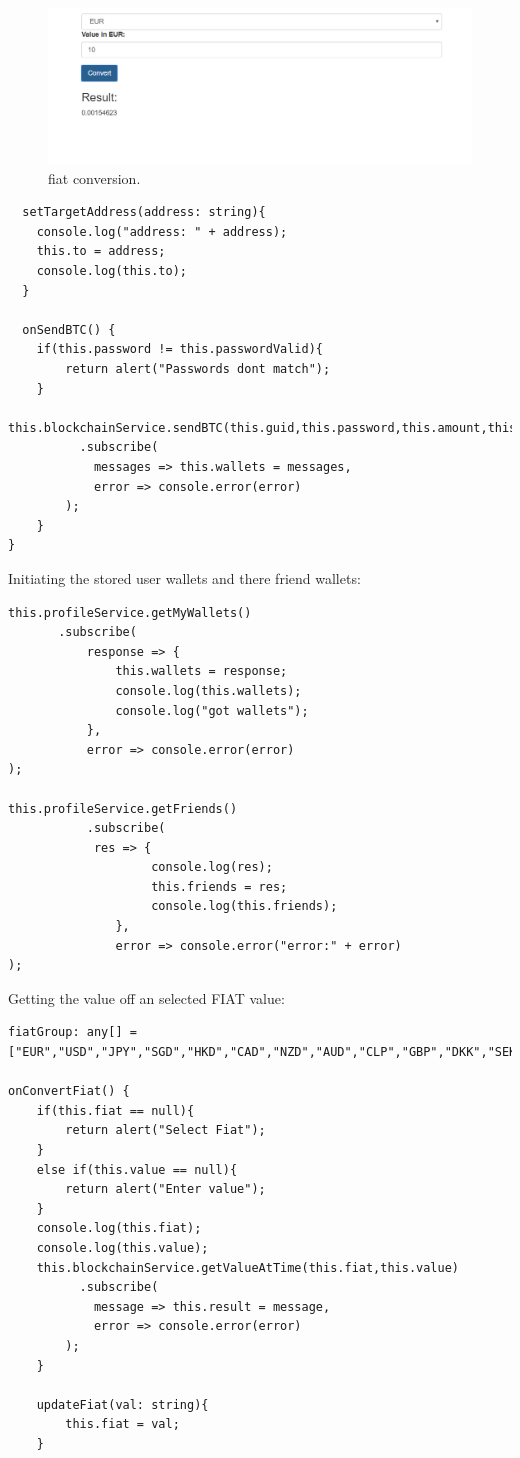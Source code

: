 \begin{figure}[H]
\centering
\includegraphics[]{img/fiat.png}
\caption{fiat conversion.}
\end{figure}

\begin{lstlisting}
  setTargetAddress(address: string){
    console.log("address: " + address);
    this.to = address;
    console.log(this.to);
  }

  onSendBTC() {
    if(this.password != this.passwordValid){
        return alert("Passwords dont match");
    }
    this.blockchainService.sendBTC(this.guid,this.password,this.amount,this.to)
          .subscribe(
            messages => this.wallets = messages,
            error => console.error(error)
        );
    }
}
\end{lstlisting}

Initiating the stored user wallets and there friend wallets:
\begin{lstlisting}
this.profileService.getMyWallets()
       .subscribe(
           response => {
               this.wallets = response;
               console.log(this.wallets);
               console.log("got wallets");
           },
           error => console.error(error)
);

this.profileService.getFriends()
           .subscribe(
            res => {
                    console.log(res);
                    this.friends = res;
                    console.log(this.friends);
               },
               error => console.error("error:" + error)
);
\end{lstlisting}

Getting the value off an selected FIAT value:
\begin{lstlisting}
fiatGroup: any[] = ["EUR","USD","JPY","SGD","HKD","CAD","NZD","AUD","CLP","GBP","DKK","SEK","ISK","CHF","BRL","RUB","PLN","THB","KRW","TWD"];

onConvertFiat() {
    if(this.fiat == null){
        return alert("Select Fiat");
    }
    else if(this.value == null){
        return alert("Enter value");
    }
    console.log(this.fiat);
    console.log(this.value);
    this.blockchainService.getValueAtTime(this.fiat,this.value)
          .subscribe(
            message => this.result = message,
            error => console.error(error)
        );
    }

    updateFiat(val: string){
        this.fiat = val;
    }

\end{lstlisting}

